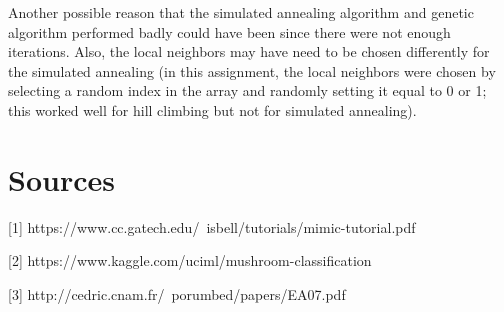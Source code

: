 \documentclass[11pt]{article}
\begin{document}
        Another possible reason that the simulated annealing algorithm and genetic algorithm
        performed badly could have been since there were not enough iterations. Also, the local
        neighbors may have need to be chosen differently for the simulated annealing (in this
        assignment, the local neighbors were chosen by selecting a random index in the array
        and randomly setting it equal to 0 or 1; this worked well for hill climbing but
        not for simulated annealing).
        \section{Sources}

        [1] https://www.cc.gatech.edu/~isbell/tutorials/mimic-tutorial.pdf

        [2] https://www.kaggle.com/uciml/mushroom-classification

        [3] http://cedric.cnam.fr/~porumbed/papers/EA07.pdf

    
\end{document}
